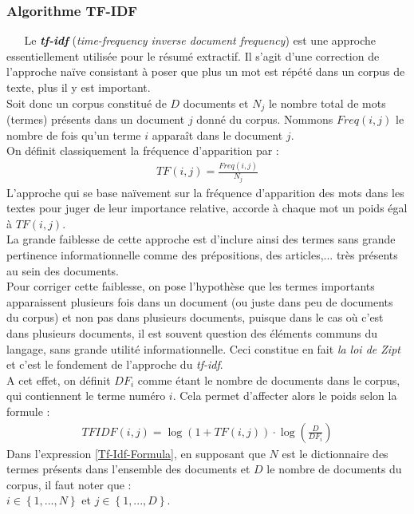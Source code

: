 \subsubsection{Algorithme TF-IDF}\label{SousSecTFIDF}
$ _{} $ $ _{} $ $ _{} $ $ _{} $ $ _{} $Le \textit{\textbf{tf-idf}} (\textit{time-frequency inverse document frequency}) est une approche essentiellement utilisée pour le résumé extractif. Il s'agit d'une correction de l'approche naïve consistant à poser que plus un mot est répété dans un corpus de texte, plus il y est important.\\

Soit donc un corpus constitué de $ D $ documents et $ N_{j} $ le nombre total de mots (termes) présents dans un document $ j $ donné du corpus. Nommons $ Freq(i,j) $ le nombre de fois qu'un terme $ i $ apparaît dans le document $ j $.\\
On définit classiquement la fréquence d'apparition par :
\begin{eqnarray}
TF(i,j) = \frac{Freq(i,j)}{N_{j}}
\end{eqnarray}
L'approche qui se base naïvement sur la fréquence d'apparition des mots dans les textes pour juger de leur importance relative, accorde à chaque mot un poids égal à $ TF(i,j) $.\\
La grande faiblesse de cette approche est d'inclure ainsi des termes sans grande pertinence in\-for\-ma\-tion\-ne\-lle comme des prépositions, des articles,... très présents au sein des documents.\\

Pour corriger cette faiblesse, on pose l'hypothèse que les termes importants apparaissent plusieurs fois dans un document (ou juste dans peu de documents du corpus) et non pas dans plusieurs documents, puisque dans le cas où c'est dans plusieurs documents, il est souvent question des éléments communs du langage, sans grande utilité informationnelle. Ceci constitue en fait \textit{la loi de Zipt} \cite{vzivzka2019text} et c'est le fondement de l'approche du \textit{tf-idf}.\\

A cet effet, on définit $ DF_{i} $ comme étant le nombre de documents dans le corpus, qui contiennent le terme numéro $ i $. Cela permet d'affecter alors le poids selon la formule \cite{berry2010text} :
\begin{eqnarray}\label{Tf-Idf-Formula}
TFIDF(i,j) = \log\left(1+TF(i,j)\right)\cdot\log\left(\frac{D}{DF_{i}}\right)
\end{eqnarray}
Dans l'expression \ref{Tf-Idf-Formula}, en supposant que $ N $ est le dictionnaire des termes présents dans l'ensemble des documents et $ D $ le nombre de documents du corpus, il faut noter que :\\
$ i \in \left\lbrace 1,...,N\right\rbrace $ et $ j \in \left\lbrace 1,...,D\right\rbrace $.\\


